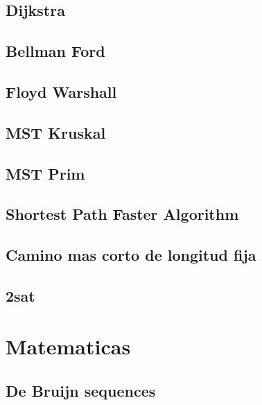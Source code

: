 \subsection{Dijkstra}
\raggedbottom
\hrulefill
\subsection{Bellman Ford}
\raggedbottom
\hrulefill
\subsection{Floyd Warshall}
\raggedbottom
\hrulefill
\subsection{MST Kruskal}
\raggedbottom
\hrulefill
\subsection{MST Prim}
\raggedbottom
\hrulefill
\subsection{Shortest Path Faster Algorithm}
\raggedbottom
\hrulefill
\subsection{Camino mas corto de longitud fija}
\raggedbottom
\hrulefill
\subsection{2sat}
\raggedbottom
\hrulefill

\section{Matematicas}
\subsection{De Bruijn sequences}
\raggedbottom
\hrulefill
